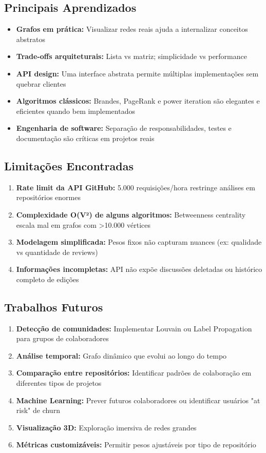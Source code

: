 \documentclass[12pt,a4paper]{article}
\begin{document}
\subsection{Principais Aprendizados}

\begin{itemize}
  \item \textbf{Grafos em prática:} Visualizar redes reais ajuda a internalizar conceitos abstratos
  \item \textbf{Trade-offs arquiteturais:} Lista vs matriz; simplicidade vs performance
  \item \textbf{API design:} Uma interface abstrata permite múltiplas implementações sem quebrar clientes
  \item \textbf{Algoritmos clássicos:} Brandes, PageRank e power iteration são elegantes e eficientes quando bem implementados
  \item \textbf{Engenharia de software:} Separação de responsabilidades, testes e documentação são críticas em projetos reais
\end{itemize}

\subsection{Limitações Encontradas}

\begin{enumerate}
  \item \textbf{Rate limit da API GitHub:} 5.000 requisições/hora restringe análises em repositórios enormes
  \item \textbf{Complexidade O(V²) de alguns algoritmos:} Betweenness centrality escala mal em grafos com >10.000 vértices
  \item \textbf{Modelagem simplificada:} Pesos fixos não capturam nuances (ex: qualidade vs quantidade de reviews)
  \item \textbf{Informações incompletas:} API não expõe discussões deletadas ou histórico completo de edições
\end{enumerate}

\subsection{Trabalhos Futuros}

\begin{enumerate}
  \item \textbf{Detecção de comunidades:} Implementar Louvain ou Label Propagation para grupos de colaboradores
  \item \textbf{Análise temporal:} Grafo dinâmico que evolui ao longo do tempo
  \item \textbf{Comparação entre repositórios:} Identificar padrões de colaboração em diferentes tipos de projetos
  \item \textbf{Machine Learning:} Prever futuros colaboradores ou identificar usuários "at risk" de churn
  \item \textbf{Visualização 3D:} Exploração imersiva de redes grandes
  \item \textbf{Métricas customizáveis:} Permitir pesos ajustáveis por tipo de repositório
\end{enumerate}
\end{document}
